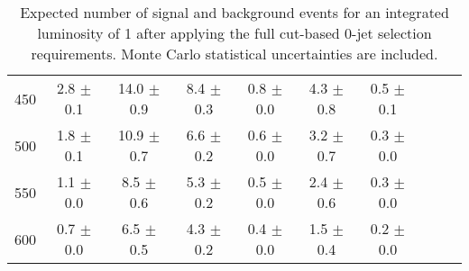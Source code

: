 \begin{table}[!ht]
\begin{center}
{\begin{tabular} {|c|c|c|c|c|c|c|c|c|c|}
450 &   2.8 $\pm$  0.1 &   14.0 $\pm$  0.9 &   8.4 $\pm$  0.3 &  0.8 $\pm$  0.0 &  4.3 $\pm$  0.8 &  0.5 $\pm$  0.1 \\
500 &   1.8 $\pm$  0.1 &   10.9 $\pm$  0.7 &   6.6 $\pm$  0.2 &  0.6 $\pm$  0.0 &  3.2 $\pm$  0.7 &  0.3 $\pm$  0.0 \\
550 &   1.1 $\pm$  0.0 &    8.5 $\pm$  0.6 &   5.3 $\pm$  0.2 &  0.5 $\pm$  0.0 &  2.4 $\pm$  0.6 &  0.3 $\pm$  0.0 \\
600 &   0.7 $\pm$  0.0 &    6.5 $\pm$  0.5 &   4.3 $\pm$  0.2 &  0.4 $\pm$  0.0 &  1.5 $\pm$  0.4 &  0.2 $\pm$  0.0 \\
 \hline
  \end{tabular}
  }
  \caption{Expected number of signal and background events for an 
  integrated luminosity of 1\ifb{} after 
  applying the full cut-based 0-jet selection requirements. Monte Carlo 
  statistical uncertainties are included.}
   \label{tab:cutbase_yields_0j}
  \end{center}
\end{table}
